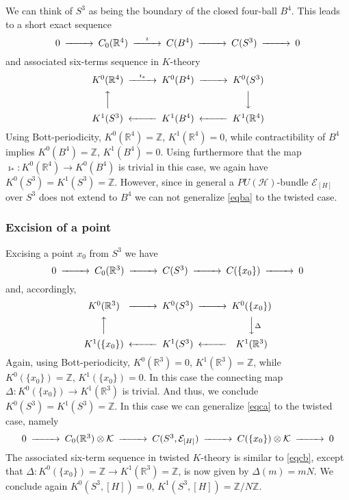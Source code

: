 \documentclass[a4paper,reqno]{amsart}
\theoremstyle{plain}
\theoremstyle{definition}
\theoremstyle{remark}
\numberwithin{equation}{section}
\numberwithin{figure}{section}
\newcommand{\cH}{{\mathcal H}}
\newcommand{\cE}{{\mathcal E}}
\newcommand{\cK}{{\mathcal K}}
\newcommand{\RR}{{\mathbb R}}
\newcommand{\ZZ}{{\mathbb Z}}
\newcommand{\<}{\langle}
\renewcommand{\>}{\rangle}
\begin{document}
We can think of $S^3$ as being the boundary of the closed four-ball
$B^4$.  This leads to a short exact sequence
\begin{equation} \label{eqba}
\begin{CD}
0 @>>> C_0(\RR^4) @>\imath>> C(B^4) @>>> C(S^3) @>>> 0
\end{CD}
\end{equation}
and associated six-terms sequence in $K$-theory
\begin{equation}
\begin{CD}
K^0(\RR^4) @>\imath_*>> K^0(B^4) @>>>   K^0(S^3) \\
        @AAA      &            &      @VVV \\
K^1(S^3)   @<<< K^1(B^4) @<<<    K^1(\RR^4)
\end{CD}
\end{equation}
Using Bott-periodicity, $K^0(\RR^4)=\ZZ$, $K^1(\RR^4)=0$, while
contractibility of $B^4$ implies $K^0(B^4)=\ZZ$, $K^1(B^4)=0$.
Using furthermore that the map $\imath_*:K^0(\RR^4)\to K^0(B^4)$
is trivial in this case, we again have $K^0(S^3)=K^1(S^3)=\ZZ$.
However, since in general a $PU(\cH)$-bundle $\cE_{[H]}$ over
$S^3$ does not extend to $B^4$ we can not generalize \eqref{eqba}
to the twisted case.

\subsubsection{Excision of a point}

Excising a point $x_0$ from $S^3$ we have
\begin{equation} \label{eqca}
\begin{CD}
0 @>>> C_0(\RR^3) @>>> C(S^3) @>>> C(\{x_0\}) @>>> 0
\end{CD}
\end{equation}
and, accordingly,
\begin{equation} \label{eqcb}
\begin{CD}
K^0(\RR^3) @>>> K^0(S^3) @>>>   K^0(\{x_0\}) \\
        @AAA      &            &      @VV\Delta V \\
K^1(\{x_0\})   @<<< K^1(S^3) @<<<    K^1(\RR^3)
\end{CD}
\end{equation}
Again, using Bott-periodicity, $K^0(\RR^3)=0$, $K^1(\RR^3)=\ZZ$, while
$K^0(\{x_0\}) =\ZZ$, $K^1(\{x_0\}) =0$.  In this case the
connecting map $\Delta:K^0(\{x_0\})\to K^1(\RR^3)$ is trivial.
And thus, we conclude $K^0(S^3)=K^1(S^3)=\ZZ$.
In this case we can generalize \eqref{eqca} to the twisted case, namely
\begin{equation} \label{eqcc}
\begin{CD}
0 @>>> C_0(\RR^3)\otimes \cK @>>> C(S^3,\cE_{[H]}) @>>>
C(\{x_0\})\otimes \cK  @>>> 0
\end{CD}
\end{equation}
The associated six-term sequence in twisted $K$-theory is similar
to \eqref{eqcb}, except that $\Delta:K^0(\{x_0\})=\ZZ\to K^1(\RR^3)=\ZZ$,
is now given by $\Delta(m) = mN$.
We conclude again $K^0(S^3,[H])=0$, $K^1(S^3,[H])=\ZZ/N\ZZ$.
\end{document}

